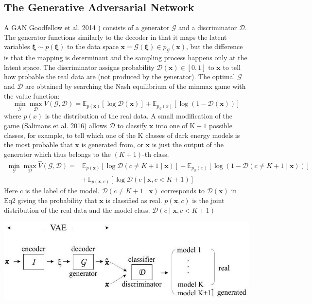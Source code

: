 \documentclass[10pt]{article}
\begin{document}
\subsection{The Generative Adversarial Network}
A GAN Goodfellow et al. 2014 ) consists of a generator $\mathcal{G}$ and a discriminator $\mathcal{D}$. The generator functions similarly to the decoder in that it maps the latent variables $\boldsymbol{\xi} \sim p(\boldsymbol{\xi})$ to the data space $\boldsymbol{x}=\mathcal{G}(\boldsymbol{\xi}) \in p_{\mathcal{G}}(\boldsymbol{x})$, but the difference is that the mapping is determinant and the sampling process happens only at the latent space. The discriminator assigns probability $\mathcal{D}(\boldsymbol{x}) \in[0,1]$ to $\boldsymbol{x}$ to tell how probable the real data are (not produced by the generator). The optimal $\mathcal{G}$ and $\mathcal{D}$ are obtained by searching the Nash equilibrium of the minmax game with the value function:
$$
\min _{\mathcal{G}} \max _{\mathcal{D}} V(\mathcal{G}, \mathcal{D})=\mathbb{E}_{p(\boldsymbol{x})}[\log \mathcal{D}(\boldsymbol{x})]+\mathbb{E}_{p_{\mathcal{G}}(x)}[\log (1-\mathcal{D}(\boldsymbol{x}))]
$$
where $p(x)$ is the distribution of the real data. A small modification of the game (Salimans et al. 2016) allows $\mathcal{D}$ to classify $\boldsymbol{x}$ into one of $\mathrm{K}+1$ possible classes, for example, to tell which one of the $\mathrm{K}$ classes of dark energy models is the most probable that $\boldsymbol{x}$ is generated from, or $\boldsymbol{x}$ is just the output of the generator which thus belongs to the $(K+1)$-th class.
$$
\begin{aligned}
\min _{\mathcal{G}} \max _{\mathcal{D}} \hat{V}(\mathcal{G}, \mathcal{D})=& \mathbb{E}_{p(\boldsymbol{x})}[\log \mathcal{D}(c \neq K+1 \mid \boldsymbol{x})]+\mathbb{E}_{p_{\mathcal{G}}(x)}[\log (1-\mathcal{D}(c \neq K+1 \mid \boldsymbol{x}))] \\
&+\mathbb{E}_{p(\boldsymbol{x}, c)}[\log \mathcal{D}(c \mid \boldsymbol{x}, c<K+1)]
\end{aligned}
$$
Here $c$ is the label of the model. $\mathcal{D}(c \neq K+1 \mid \boldsymbol{x})$ corresponds to $\mathcal{D}(\boldsymbol{x})$ in $\mathrm{Eq} 2$ giving the probability that $\boldsymbol{x}$ is classified as real. $p(\boldsymbol{x}, c)$ is the joint distribution of the real data and the model class. $\mathcal{D}(c \mid \boldsymbol{x}, c<K+1)$

\includegraphics[max width=\textwidth]{2022_04_28_9be604c658276336b08cg-04}
\end{document}
